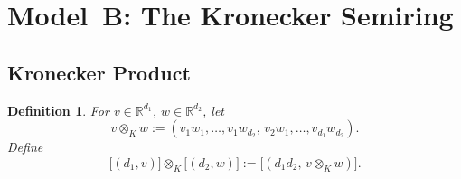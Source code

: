 \documentclass[11pt]{article}
\newtheorem{definition}[theorem]{Definition}
\begin{document}
\section{Model B: The Kronecker Semiring}
\label{sec:modelB}
\subsection{Kronecker Product}
\begin{definition}
For \(v\in\mathbb R^{d_1}\), \(w\in\mathbb R^{d_2}\), let
\[v\otimes_K w := (v_1w_1,\dots,v_1w_{d_2},\,v_2w_1,\dots,v_{d_1}w_{d_2}).\]
Define
\[\bigl[(d_1,v)\bigr]\otimes_K \bigl[(d_2,w)\bigr] := \bigl[(d_1d_2,\,v\otimes_K w)\bigr].\]
\end{definition}
\end{document}
